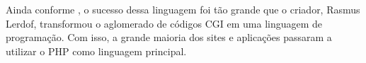 Ainda conforme , o sucesso dessa linguagem foi tão grande que o criador, Rasmus Lerdof, transformou o aglomerado de códigos CGI em uma linguagem de programação. Com isso, a grande maioria dos sites e aplicações passaram a utilizar o PHP como linguagem principal.


